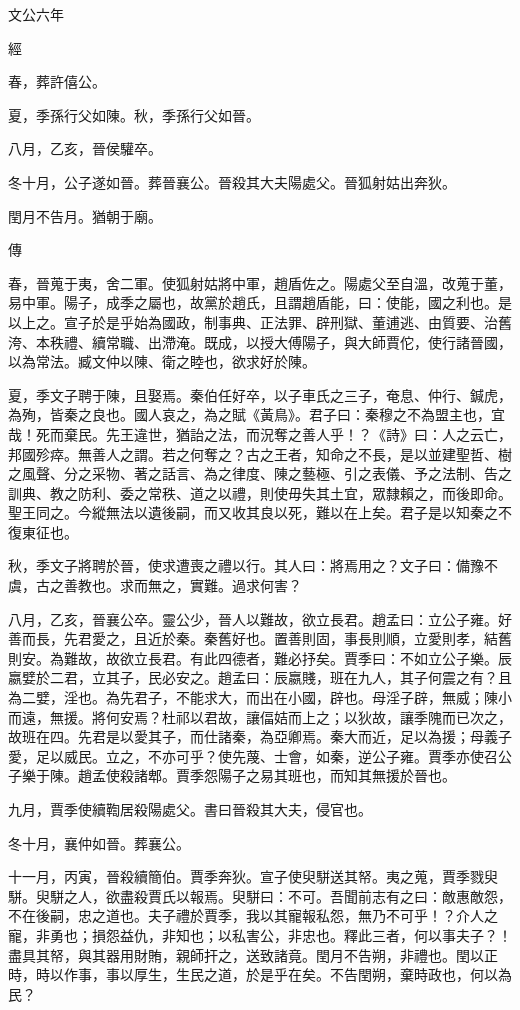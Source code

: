 \documentclass{ctexart}
\begin{document}
文公六年


經



春，葬許僖公。

夏，季孫行父如陳。秋，季孫行父如晉。

八月，乙亥，晉侯驩卒。

冬十月，公子遂如晉。葬晉襄公。晉殺其大夫陽處父。晉狐射姑出奔狄。

閏月不告月。猶朝于廟。

傳



春，晉蒐于夷，舍二軍。使狐射姑將中軍，趙盾佐之。陽處父至自溫，改蒐于董，易中軍。陽子，成季之屬也，故黨於趙氏，且謂趙盾能，曰：使能，國之利也。是以上之。宣子於是乎始為國政，制事典、正法罪、辟刑獄、董逋逃、由質要、治舊洿、本秩禮、續常職、出滯淹。既成，以授大傅陽子，與大師賈佗，使行諸晉國，以為常法。臧文仲以陳、衛之睦也，欲求好於陳。

夏，季文子聘于陳，且娶焉。秦伯任好卒，以子車氏之三子，奄息、仲行、鍼虎，為殉，皆秦之良也。國人哀之，為之賦《黃鳥》。君子曰：秦穆之不為盟主也，宜哉！死而棄民。先王違世，猶詒之法，而況奪之善人乎！？《詩》曰：人之云亡，邦國殄瘁。無善人之謂。若之何奪之？古之王者，知命之不長，是以並建聖哲、樹之風聲、分之采物、著之話言、為之律度、陳之藝極、引之表儀、予之法制、告之訓典、教之防利、委之常秩、道之以禮，則使毋失其土宜，眾隸賴之，而後即命。聖王同之。今縱無法以遺後嗣，而又收其良以死，難以在上矣。君子是以知秦之不復東征也。

秋，季文子將聘於晉，使求遭喪之禮以行。其人曰：將焉用之？文子曰：備豫不虞，古之善教也。求而無之，實難。過求何害？

八月，乙亥，晉襄公卒。靈公少，晉人以難故，欲立長君。趙孟曰：立公子雍。好善而長，先君愛之，且近於秦。秦舊好也。置善則固，事長則順，立愛則孝，結舊則安。為難故，故欲立長君。有此四德者，難必抒矣。賈季曰：不如立公子樂。辰嬴嬖於二君，立其子，民必安之。趙孟曰：辰嬴賤，班在九人，其子何震之有？且為二嬖，淫也。為先君子，不能求大，而出在小國，辟也。母淫子辟，無威；陳小而遠，無援。將何安焉？杜祁以君故，讓偪姞而上之；以狄故，讓季隗而已次之，故班在四。先君是以愛其子，而仕諸秦，為亞卿焉。秦大而近，足以為援；母義子愛，足以威民。立之，不亦可乎？使先蔑、士會，如秦，逆公子雍。賈季亦使召公子樂于陳。趙孟使殺諸郫。賈季怨陽子之易其班也，而知其無援於晉也。

九月，賈季使續鞫居殺陽處父。書曰晉殺其大夫，侵官也。

冬十月，襄仲如晉。葬襄公。

十一月，丙寅，晉殺續簡伯。賈季奔狄。宣子使臾駢送其帑。夷之蒐，賈季戮臾駢。臾駢之人，欲盡殺賈氏以報焉。臾駢曰：不可。吾聞前志有之曰：敵惠敵怨，不在後嗣，忠之道也。夫子禮於賈季，我以其寵報私怨，無乃不可乎！？介人之寵，非勇也；損怨益仇，非知也；以私害公，非忠也。釋此三者，何以事夫子？！盡具其帑，與其器用財賄，親師扞之，送致諸竟。閏月不告朔，非禮也。閏以正時，時以作事，事以厚生，生民之道，於是乎在矣。不告閏朔，棄時政也，何以為民？
\end{document}
